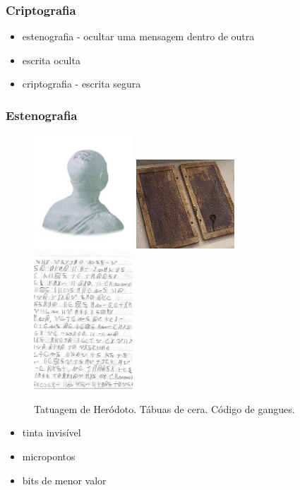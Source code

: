 \begin{frame}
\frametitle{Criptografia}

\begin{itemize}
\item estenografia - ocultar uma mensagem dentro de outra
\item escrita oculta
\item criptografia - escrita segura
\end{itemize}

\end{frame}



\begin{frame}[allowframebreaks]
\frametitle{Estenografia}
\begin{figure}[h]
\centering
\includegraphics[width=0.33\textwidth,height=0.7\textheight,keepaspectratio]{figures/herodotus.jpg}
\includegraphics[width=0.33\textwidth,height=0.7\textheight,keepaspectratio]{figures/waxtablet.jpg}
\includegraphics[width=0.33\textwidth,height=0.7\textheight,keepaspectratio]{figures/gangcode.jpg}
\caption{Tatuagem de Heródoto. Tábuas de cera. Código de gangues.}
\label{fig-estenografia}
\end{figure}

\begin{itemize}
\item tinta invisível
\item micropontos
\item bits de menor valor
\end{itemize}
\end{frame}




